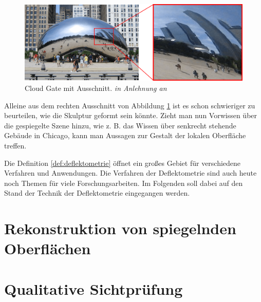 \begin{figure}[H]
	\centering
	\includegraphics[width=\textwidth]{02_grundlagenZurDeflektometrie/figures/cloudGateMitAusschnitt}
	\caption[Cloud Gate mit Ausschnitt]{Cloud Gate mit Ausschnitt. \textit{in Anlehnung an} \cite{cloudGateChicago}}
	\label{img:cloudGateMitAusschnitt}
\end{figure}

\noindent
Alleine aus dem rechten Ausschnitt von Abbildung \ref{img:cloudGateMitAusschnitt} ist es schon schwieriger zu beurteilen, wie die Skulptur geformt sein könnte.
Zieht man nun Vorwissen über die gespiegelte Szene hinzu, wie z. B. das Wissen über senkrecht stehende Gebäude in Chicago, kann man Aussagen zur Gestalt der lokalen Oberfläche treffen.

\p
Die Definition \ref{def:deflektometrie} öffnet ein großes Gebiet für verschiedene Verfahren und Anwendungen.
Die Verfahren der Deflektometrie sind auch heute noch Themen für viele Forschungsarbeiten.
Im Folgenden soll dabei auf den Stand der Technik der Deflektometrie eingegangen werden.


{
	\FloatBarrier
    \section{Rekonstruktion von spiegelnden Oberflächen}
    \label{sub:rekonstruktion}
    
}

{
	\FloatBarrier
    \section{Qualitative Sichtprüfung}
    \label{sub:qualitativeSichtpruefung}
    
}